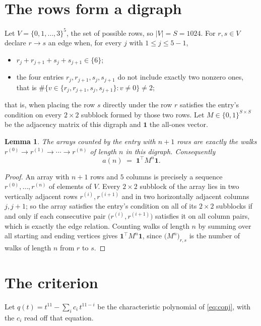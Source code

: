 \documentclass[11pt,a4paper]{article}
\theoremstyle{plain}
\newtheorem{lemma}[theorem]{Lemma}
\theoremstyle{definition}
\begin{document}
\section{The rows form a digraph}

Let $V=\{0,1,\dots,3\}^{5}$, the set of possible rows, so $|V|=S=1024$. For
$r,s\in V$ declare $r\to s$ an edge when, for every $j$ with $1\le j\le 5-1$,
\begin{itemize}
\item $r_j+r_{j+1}+s_j+s_{j+1}\in\{6\}$;
\item the four entries $r_j,r_{j+1},s_j,s_{j+1}$ do not include exactly two nonzero ones, that is $\#\bigl\{v\in\{r_j,r_{j+1},s_j,s_{j+1}\}: v\ne0\bigr\}\ne2$;
\end{itemize}
that is, when placing the row $s$ directly under the row $r$ satisfies the entry's
condition on every $2\times2$ subblock formed by those two rows. Let $M\in\{0,1\}^{S\times
S}$ be the adjacency matrix of this digraph and $\mathbf{1}$ the all-ones vector.

\begin{lemma}\label{lem:walk}
The arrays counted by the entry with $n+1$ rows are exactly the walks
$r^{(0)}\to r^{(1)}\to\cdots\to r^{(n)}$ of length $n$ in this digraph. Consequently
\[
a(n)\;=\;\mathbf{1}^{\!\top}M^{n}\mathbf{1} .
\]
\end{lemma}

\begin{proof}
An array with $n+1$ rows and $5$ columns is precisely a sequence
$r^{(0)},\dots,r^{(n)}$ of elements of $V$. Every $2\times2$ subblock of the array lies
in two vertically adjacent rows $r^{(i)},r^{(i+1)}$ and in two horizontally adjacent
columns $j,j+1$; so the array satisfies the entry's condition on all of its $2\times2$
subblocks if and only if each consecutive pair $\bigl(r^{(i)},r^{(i+1)}\bigr)$ satisfies
it on all column pairs, which is exactly the edge relation. Counting walks of length $n$ by
summing over all starting and ending vertices gives
$\mathbf{1}^{\!\top}M^{n}\mathbf{1}$, since
$\bigl(M^{n}\bigr)_{r,s}$ is the number of walks of length $n$ from $r$ to $s$.
\end{proof}

\section{The criterion}

Let $q(t)=t^{11}-\sum_{i}c_i\,t^{11-i}$ be the characteristic polynomial of
\eqref{eq:conj}, with the $c_i$ read off that equation.
\end{document}
